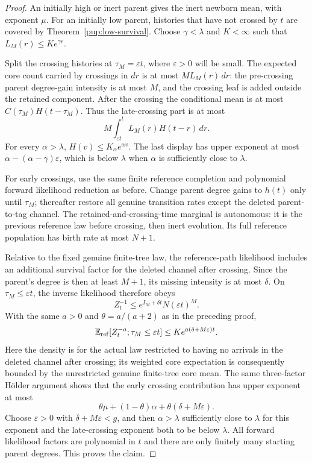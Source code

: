 \begin{proof}
An initially high or inert parent gives the inert newborn mean, with exponent
$\mu$.  For an initially low parent, histories that have not crossed by
$t$ are covered by Theorem~\ref{pup:low-survival}.  Choose
$\gamma<\lambda$ and $K<\infty$ such that $L_M(r)\le Ke^{\gamma r}$.

Split the crossing histories at $\tau_M=\varepsilon t$, where
$\varepsilon>0$ will be small.  The expected core count carried by
crossings in $dr$ is at most $M L_M(r)\,dr$: the pre-crossing parent
degree-gain intensity is at most $M$, and the crossing leaf is added
outside the retained component.  After the crossing the conditional
mean is at most $C(\tau_M)H(t-\tau_M)$.  Thus the late-crossing part
is at most
\[
 M\int_{\varepsilon t}^t L_M(r)H(t-r)\,dr.
\]
For every $\alpha>\lambda$, $H(v)\le K_\alpha e^{\alpha v}$.
The last display has upper exponent at most
$\alpha-(\alpha-\gamma)\varepsilon$, which is below $\lambda$ when
$\alpha$ is sufficiently close to $\lambda$.

For early crossings, use the same finite reference completion and
polynomial forward likelihood reduction as before.  Change parent
degree gains to $h(t)$ only until $\tau_M$; thereafter restore all
genuine transition rates except the deleted parent-to-tag channel.
The retained-and-crossing-time marginal is autonomous: it is the
previous reference law before crossing, then inert evolution.
Its full reference population has birth rate at most $N+1$.

Relative to the fixed genuine finite-tree law, the reference-path
likelihood includes an additional survival factor for the deleted
channel after crossing.  Since the parent's degree is then at least
$M+1$, its missing intensity is at most $\delta$.  On
$\tau_M\le\varepsilon t$, the inverse likelihood therefore obeys
\[
 Z_t^{-1}\le e^{I_M+\delta t}N(\varepsilon t)^M.
\]
With the same $a>0$ and $\theta=a/(a+2)$ as in the preceding proof,
\[
 \mathbb E_{\rm ref}
 [Z_t^{-a};\tau_M\le\varepsilon t]
 \le K e^{a(\delta+M\varepsilon)t}.
\]
Here the density is for the actual law restricted to having no arrivals
in the deleted channel after crossing; its weighted core expectation
is consequently bounded by the unrestricted genuine finite-tree core
mean.  The same three-factor H\"older argument shows that the early
crossing contribution has upper exponent at most
\[
 \theta\mu+(1-\theta)\alpha+
       \theta(\delta+M\varepsilon).
\]
Choose $\varepsilon>0$ with $\delta+M\varepsilon<g$, and then
$\alpha>\lambda$ sufficiently close to $\lambda$ for this exponent
and the late-crossing exponent both to be below $\lambda$.
All forward likelihood factors are polynomial in $t$ and there are
only finitely many starting parent degrees.  This proves the claim.
\end{proof}

